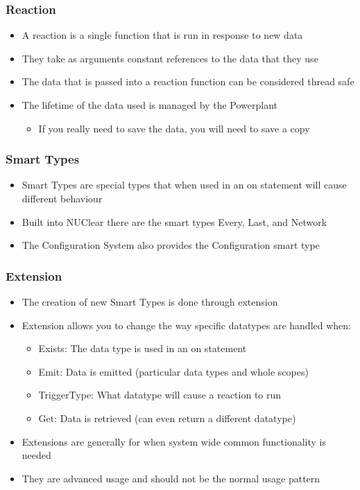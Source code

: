 \documentclass{beamer}
\begin{document}
\begin{frame}
	\frametitle{Reaction}
	\begin{itemize}
		\item A reaction is a single function that is run in response to new data
		\item They take as arguments constant references to the data that they use
		\item The data that is passed into a reaction function can be considered thread safe
		\item The lifetime of the data used is managed by the Powerplant 
			\begin{itemize}
				\item If you really need to save the data, you will need to save a copy
			\end{itemize}
	\end{itemize}
\end{frame}

\begin{frame}
	\frametitle{Smart Types}
	\begin{itemize}
		\item Smart Types are special types that when used in an on statement will cause different behaviour
		\item Built into NUClear there are the smart types Every, Last, and Network
		\item The Configuration System also provides the Configuration smart type
	\end{itemize}
\end{frame}

\begin{frame}
	\frametitle{Extension}
	\begin{itemize}
		\item The creation of new Smart Types is done through extension
		\item Extension allows you to change the way specific datatypes are handled when:
			\begin{itemize}
				\item Exists: The data type is used in an on statement
				\item Emit: Data is emitted (particular data types and whole scopes)
				\item TriggerType: What datatype will cause a reaction to run
				\item Get: Data is retrieved (can even return a different datatype)
			\end{itemize}
		\item Extensions are generally for when system wide common functionality is needed
		\item They are advanced usage and should not be the normal usage pattern
	\end{itemize}
\end{frame}
\end{document}
